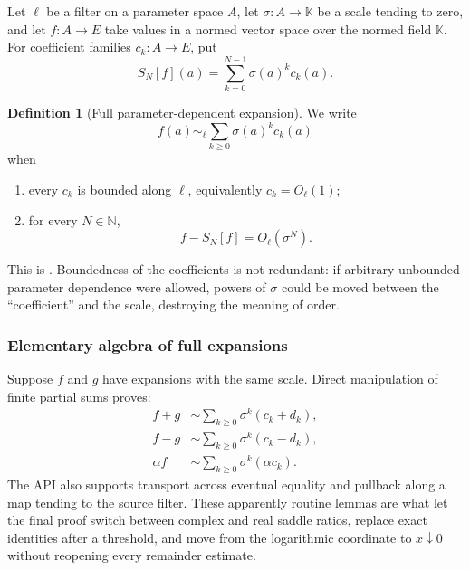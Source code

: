 \documentclass[11pt,oneside]{article}
\theoremstyle{definition}
\newtheorem{definition}[theorem]{Definition}
\theoremstyle{remark}
\newcommand{\N}{\mathbb N}
\begin{document}
Let $\ell$ be a filter on a parameter space $A$, let $\sigma:A\to\mathbb K$ be a scale tending
to zero, and let $f:A\to E$ take values in a normed vector space over the normed field
$\mathbb K$.  For coefficient families $c_k:A\to E$, put
\begin{equation}
 S_N[f](a)=\sum_{k=0}^{N-1}\sigma(a)^k c_k(a).
 \label{integration:eq:parameter-partial-sum}
\end{equation}

\begin{definition}[Full parameter-dependent expansion]
\label{integration:def:parameter-expansion}
We write
\begin{equation}
 f(a)\sim_{\ell}\sum_{k\ge0}\sigma(a)^kc_k(a)
 \label{integration:eq:parameter-expansion-symbol}
\end{equation}
when
\begin{enumerate}
 \item every $c_k$ is bounded along $\ell$, equivalently $c_k=O_{\ell}(1)$;
 \item for every $N\in\N$,
 \begin{equation}
  f-S_N[f]=O_{\ell}(\sigma^N).
  \label{integration:eq:parameter-expansion-remainder}
 \end{equation}
\end{enumerate}
\end{definition}

This is .  Boundedness of the coefficients is not redundant: if
arbitrary unbounded parameter dependence were allowed, powers of $\sigma$ could be moved
between the ``coefficient'' and the scale, destroying the meaning of order.

\subsubsection{Elementary algebra of full expansions}

Suppose $f$ and $g$ have expansions with the same scale.  Direct manipulation of finite
partial sums proves:
\begin{align}
 f+g&\sim\sum_{k\ge0}\sigma^k(c_k+d_k),                    \label{integration:eq:expansion-add}\\
 f-g&\sim\sum_{k\ge0}\sigma^k(c_k-d_k),                    \label{integration:eq:expansion-sub}\\
 \alpha f&\sim\sum_{k\ge0}\sigma^k(\alpha c_k).            \label{integration:eq:expansion-smul}
\end{align}
The API also supports transport across eventual equality and pullback along a map tending to
the source filter.  These apparently routine lemmas are what let the final proof switch
between complex and real saddle ratios, replace exact identities after a threshold, and move
from the logarithmic coordinate to $x\downarrow0$ without reopening every remainder
estimate.
\end{document}
